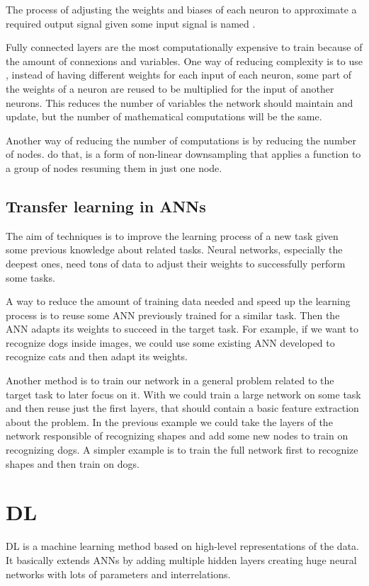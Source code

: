 The process of adjusting the weights and biases of each neuron to approximate a required output signal given some input
signal is named .

Fully connected layers are the most computationally expensive to train because of the amount of connexions and variables.
One way of reducing complexity is to use , instead of having different weights for each input of each neuron,
some part of the weights of a neuron are reused to be multiplied for the input of another neurons.
This reduces the number of variables the network should maintain and update, but the number of mathematical computations
will be the same.

Another way of reducing the number of computations is by reducing the number of nodes.
 do that, is a form of non-linear downsampling that applies a function to a group of nodes resuming them
in just one node.

\subsection{Transfer learning in \aclp{ANN} \label{subsec:TransferLearning}}
The aim of  techniques is to improve the learning process of a new task given some previous knowledge
about related tasks.
Neural networks, especially the deepest ones, need tons of data to adjust their weights to successfully perform some tasks.

A way to reduce the amount of training data needed and speed up the learning process is to reuse some \ac{ANN} previously
trained for a similar task.
Then the \ac{ANN} adapts its weights to succeed in the target task.
For example, if we want to recognize dogs inside images, we could use some existing \ac{ANN} developed to recognize cats and
then adapt its weights.

Another method is to train our network in a general problem related to the target task to later focus on it.
With  we could train a large network on some task and then reuse just the first layers, that should
contain a basic feature extraction about the problem.
In the previous example we could take the layers of the network responsible of recognizing shapes and add some new nodes
to train on recognizing dogs.
A simpler example is to train the full network first to recognize shapes and then train on dogs.

\section{\acl{DL}}
\acf{DL} is a machine learning method based on high-level representations of the data.
It basically extends \acp{ANN} by adding multiple hidden layers creating huge neural networks with lots of parameters and interrelations.

